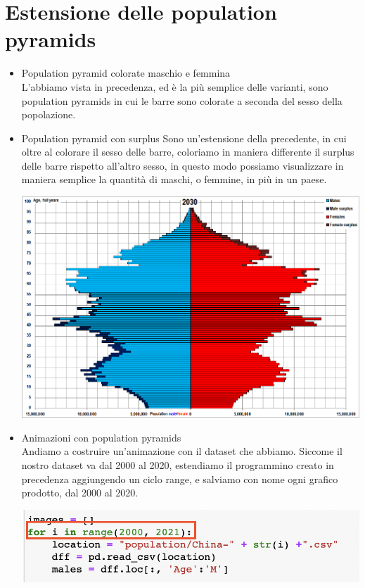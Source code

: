 \documentclass[11pt, oneside]{article}   	%
\begin{document}
\section{Estensione delle population pyramids}
\begin{itemize}
\item Population pyramid colorate maschio e femmina\\
L'abbiamo vista in precedenza, ed è la più semplice delle varianti, sono population pyramids in cui le barre sono colorate a seconda del sesso della popolazione.
\item Population pyramid con surplus
Sono un'estensione della precedente, in cui oltre al colorare il sesso delle barre, coloriamo in maniera differente il surplus delle barre rispetto all'altro sesso, in questo modo possiamo visualizzare in maniera semplice la quantità di maschi, o femmine, in più in un paese.
\begin{center}
\includegraphics[scale=0.6]{china}
\end{center}
\item Animazioni con population pyramids\\
Andiamo a costruire un'animazione con il dataset che abbiamo.
Siccome il nostro dataset va dal 2000 al 2020, estendiamo il programmino creato in precedenza aggiungendo un ciclo range, e salviamo con nome ogni grafico prodotto, dal 2000 al 2020.

\begin{center}
\includegraphics[scale=0.5]{china1}


\end{center}
\end{itemize}
\end{document}
